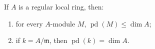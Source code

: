 If $A$ is a regular local ring, then:
\begin{enumerate}
\item[(a)] for every $A$-module $M$, $\operatorname{pd}(M) \leq \dim A$;
\item[(b)] if $k = A/\mathfrak{m}$, then $\operatorname{pd}(k) = \dim A$.
\end{enumerate}

